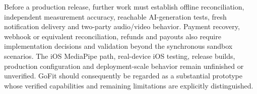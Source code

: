 \documentclass[12pt,a4paper,openany]{report}
\begin{document}
Before a production release, further work must establish offline reconciliation, independent measurement accuracy, reachable AI-generation tests, fresh notification delivery and two-party audio/video behavior. Payment recovery, webhook or equivalent reconciliation, refunds and payouts also require implementation decisions and validation beyond the synchronous sandbox scenarios. The iOS MediaPipe path, real-device iOS testing, release builds, production configuration and deployment-scale behavior remain unfinished or unverified. GoFit should consequently be regarded as a substantial prototype whose verified capabilities and remaining limitations are explicitly distinguished.



\clearpage\nocite{*}\printbibliography[heading=bibliography,title={Bibliography}]
\end{document}
